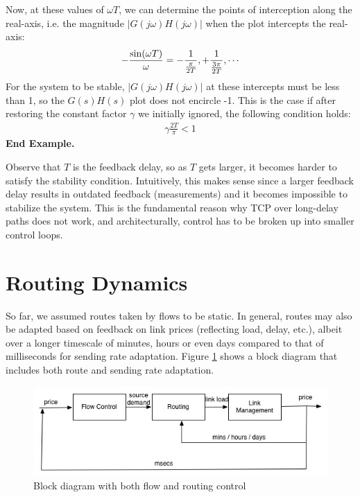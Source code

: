 \documentclass{article}
\def\sn{{\rm sin}}
\begin{document}
Now, at these values of $\omega T$, we can determine the points of interception along the real-axis, i.e.
the magnitude $|G(j \omega) H(j \omega)|$ when the plot intercepts the real-axis:
\begin{eqnarray*}
 - \frac{\sn(\omega T)}{\omega} = - \frac{1}{\frac{\pi}{2T}}, +\frac{1}{\frac{3 \pi}{2T}}, \cdots
\end{eqnarray*}
For the system to be stable, $|G(j \omega) H(j \omega)|$ at these intercepts must be less than 1,
so the $G(s) H(s)$ plot does not encircle -1.
This is the case if after restoring the constant factor $\gamma$ we initially ignored, 
the following condition holds:
\begin{eqnarray*}
\gamma \frac{2T}{\pi} < 1
\end{eqnarray*}  {\bf End Example.}


Observe that $T$ is the feedback delay, so as $T$ gets larger, it becomes harder to satisfy the stability condition.
Intuitively, this makes sense since a larger feedback delay results in outdated feedback (measurements) and 
it becomes impossible to stabilize the system. 
This is the fundamental reason why TCP over long-delay paths does not work, and
architecturally, control has to be broken up into smaller control loops.


\section{Routing Dynamics}
\label{sec:routing}

So far, we assumed routes taken by flows to be static. In general, routes may also be adapted based on feedback on link prices (reflecting load, delay, etc.), 
albeit over a longer timescale of minutes, hours or even days compared to that of milliseconds for sending rate adaptation.
Figure \ref{fig:block-routing} shows a block diagram that includes both route and sending rate adaptation.
\begin{figure}[htbp]
   \centering
   \includegraphics[width=5in]{figures/block-routing.jpg} %
   \caption{Block diagram with both flow and routing control}
   \label{fig:block-routing}
\end{figure}
\end{document}

